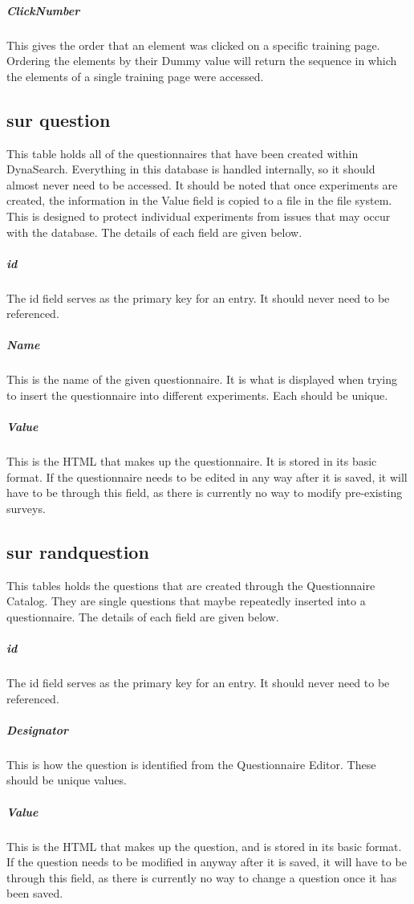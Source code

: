 \documentclass[article]{ij4uq}              %
\begin{document}
\subparagraph{ClickNumber}
This gives the order that an element was clicked on a specific training page. Ordering the elements by their Dummy value will return the sequence in which the elements of a single training page were accessed.

\subsection{sur question}
This table holds all of the questionnaires that have been created within DynaSearch. Everything in this database is handled internally, so it should almost never need to be accessed. It should be noted that once experiments are created, the information in the Value field is copied to a file in the file system. This is designed to protect individual experiments from issues that may occur with the database. The details of each field are given below.

\subparagraph{id}
The id field serves as the primary key for an entry. It should never need to be referenced. 

\subparagraph{Name}
This is the name of the given questionnaire. It is what is displayed when trying to insert the questionnaire into different experiments. Each should be unique. 

\subparagraph{Value}
This is the HTML that makes up the questionnaire. It is stored in its basic format. If the questionnaire needs to be edited in any way after it is saved, it will have to be through this field, as there is currently no way to modify pre-existing surveys. 

\subsection{sur randquestion}
This tables holds the questions that are created through the Questionnaire Catalog. They are single questions that maybe repeatedly inserted into a questionnaire. The details of each field are given below. 

\subparagraph{id}
The id field serves as the primary key for an entry. It should never need to be referenced. 

\subparagraph{Designator}
This is how the question is identified from the Questionnaire Editor. These should be unique values. 

\subparagraph{Value}
This is the HTML that makes up the question, and is stored in its basic format. If the question needs to be modified in anyway after it is saved, it will have to be through this field, as there is currently no way to change a question once it has been saved. 
\end{document}
